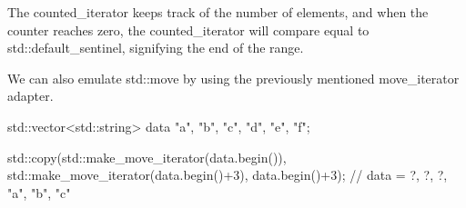 The counted\_iterator keeps track of the number of elements, and when the counter reaches zero, the counted\_iterator will compare equal to std::default\_sentinel, signifying the end of the range.

We can also emulate std::move by using the previously mentioned move\_iterator adapter.

\begin{box-note}
\begin{cppcode}
std::vector<std::string> data{ "a", "b", "c", "d", "e", "f"};

std::copy(std::make_move_iterator(data.begin()), std::make_move_iterator(data.begin()+3), 
          data.begin()+3);
// data = { ?, ?, ?, "a", "b", "c" }
\end{cppcode}
\end{box-note}
